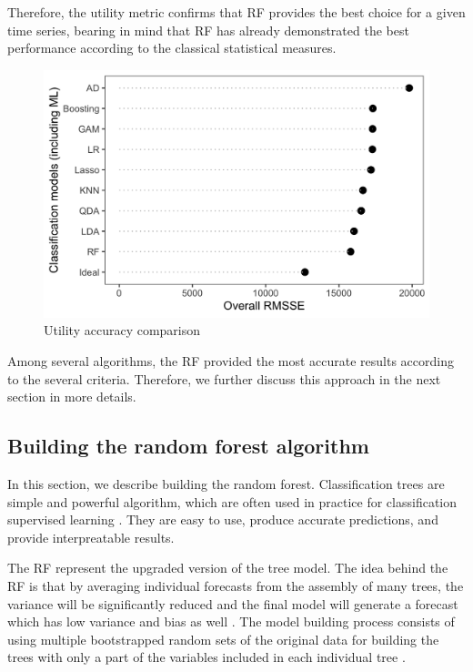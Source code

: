 \documentclass[]{elsarticle} %
\begin{document}
Therefore, the utility metric confirms that RF provides the best choice
for a given time series, bearing in mind that RF has already
demonstrated the best performance according to the classical statistical
measures.

\begin{figure}[H]

{\centering \includegraphics[width=0.6\linewidth]{img/300dpi/utility} 

}

\caption{Utility accuracy comparison}\label{fig:tableCB}
\end{figure}

Among several algorithms, the RF provided the most accurate results
according to the several criteria. Therefore, we further discuss this
approach in the next section in more details.

\hypertarget{building-the-random-forest-algorithm}{%
\subsection{Building the random forest
algorithm}\label{building-the-random-forest-algorithm}}

In this section, we describe building the random forest. Classification
trees are simple and powerful algorithm, which are often used in
practice for classification supervised learning
\citep{friedman2001elements}. They are easy to use, produce accurate
predictions, and provide interpreatable results.

The RF represent the upgraded version of the tree model. The idea behind
the RF is that by averaging individual forecasts from the assembly of
many trees, the variance will be significantly reduced and the final
model will generate a forecast which has low variance and bias as well
\citep{friedman2001elements}. The model building process consists of
using multiple bootstrapped random sets of the original data for
building the trees with only a part of the variables included in each
individual tree \citep{breiman1996bagging}.
\end{document}
